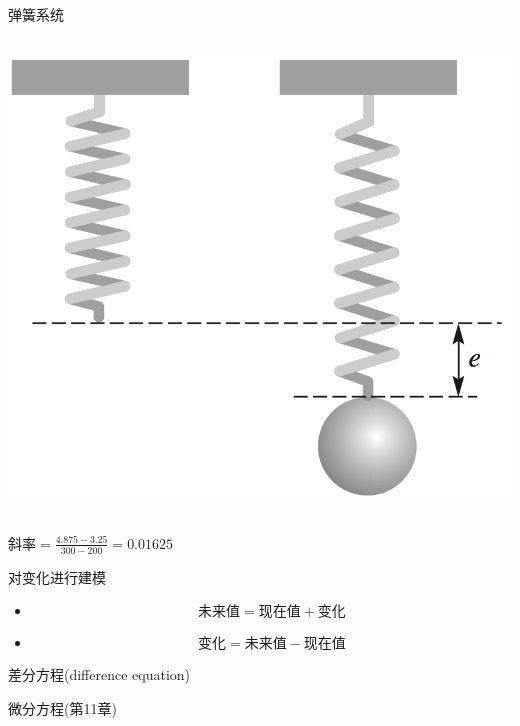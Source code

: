 \documentclass[
  ignorenonframetext,
]{ctexbeamer}
\providecommand{\tightlist}{%
  \setlength{\itemsep}{0pt}\setlength{\parskip}{0pt}}\usepackage{longtable,booktabs,array}
\begin{document}
\begin{frame}{弹簧系统}
\begin{columns}[T]
\begin{column}{0.2\textwidth}
\includegraphics{spring.png}
\end{column}
\end{columns}

\(斜率 = \frac{4.875-3.25}{300-200} = 0.01625\)
\end{frame}

\begin{frame}{对变化进行建模}
\label{ux5bf9ux53d8ux5316ux8fdbux884cux5efaux6a21}
\begin{itemize}
\tightlist
\item
  \[未来值 = 现在值 + 变化\]
\item
  \[变化 = 未来值 - 现在值\]
\end{itemize}

\begin{description}
\tightlist
\item[离散时间]
差分方程(difference equation)
\item[连续时间]
微分方程(第11章)
\end{description}
\end{frame}
\end{document}
